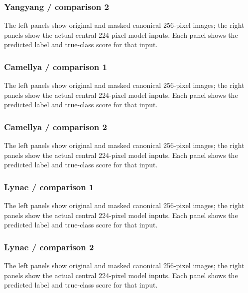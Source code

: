 \documentclass[11pt]{article}
\begin{document}
\clearpage
\subsubsection*{Yangyang / comparison 2}
The left panels show original and masked canonical 256-pixel images; the right panels show the actual central 224-pixel model inputs.
Each panel shows the predicted label and true-class score for that input.
\par\noindent {}\par

\clearpage
\subsubsection*{Camellya / comparison 1}
The left panels show original and masked canonical 256-pixel images; the right panels show the actual central 224-pixel model inputs.
Each panel shows the predicted label and true-class score for that input.
\par\noindent {}\par

\clearpage
\subsubsection*{Camellya / comparison 2}
The left panels show original and masked canonical 256-pixel images; the right panels show the actual central 224-pixel model inputs.
Each panel shows the predicted label and true-class score for that input.
\par\noindent {}\par

\clearpage
\subsubsection*{Lynae / comparison 1}
The left panels show original and masked canonical 256-pixel images; the right panels show the actual central 224-pixel model inputs.
Each panel shows the predicted label and true-class score for that input.
\par\noindent {}\par

\clearpage
\subsubsection*{Lynae / comparison 2}
The left panels show original and masked canonical 256-pixel images; the right panels show the actual central 224-pixel model inputs.
Each panel shows the predicted label and true-class score for that input.
\par\noindent {}\par
\end{document}

